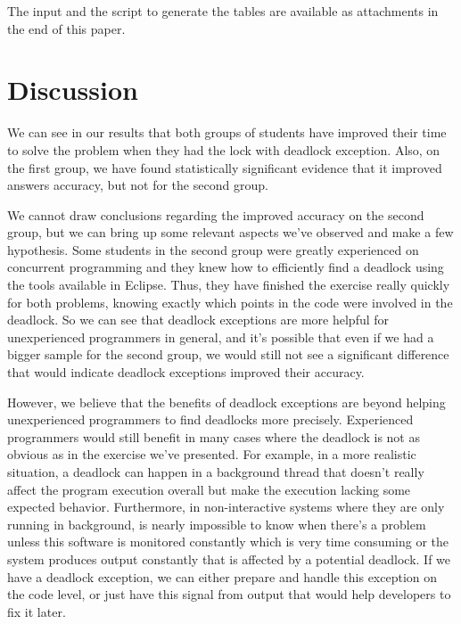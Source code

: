 The input and the script to generate the tables are available as attachments in the end of this paper.


\section{Discussion}


We can see in our results that both groups of students have improved their time to solve the problem when they had the lock with deadlock exception. Also, on the first group, we have found statistically significant evidence that it improved answers accuracy, but not for the second group.

We cannot draw conclusions regarding the improved accuracy on the second group, but we can bring up some relevant aspects we've observed and make a few hypothesis. Some students in the second group were greatly experienced on concurrent programming and they knew how to efficiently find a deadlock using the tools available in Eclipse. Thus, they have finished the exercise really quickly for both problems, knowing exactly which points in the code were involved in the deadlock. So we can see that deadlock exceptions are more helpful for unexperienced programmers in general, and it's possible that even if we had a bigger sample for the second group, we would still not see a significant difference that would indicate deadlock exceptions improved their accuracy.

However, we believe that the benefits of deadlock exceptions are beyond helping unexperienced programmers to find deadlocks more precisely. Experienced programmers would still benefit in many cases where the deadlock is not as obvious as in the exercise we've presented. For example, in a more realistic situation, a deadlock can happen in a background thread that doesn't really affect the program execution overall but make the execution lacking some expected behavior. Furthermore, in non-interactive systems where they are only running in background, is nearly impossible to know when there's a problem unless this software is monitored constantly which is very time consuming or the system produces output constantly that is affected by a potential deadlock. If we have a deadlock exception, we can either prepare and handle this exception on the code level, or just have this signal from output that would help developers to fix it later.

